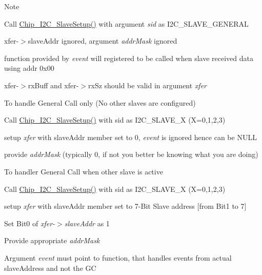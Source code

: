 \begin{DoxyNote}{Note}
\begin{DoxyItemize}
\item Call \hyperlink{group___i2_c__18_x_x__43_x_x_gaf6ea40668dde26e406f76ff3ddeda527}{Chip\+\_\+\+I2\+C\+\_\+\+Slave\+Setup()} with argument {\itshape sid} as I2\+C\+\_\+\+S\+L\+A\+V\+E\+\_\+\+G\+E\+N\+E\+R\+AL
\begin{DoxyItemize}
\item xfer-\/$>$slave\+Addr ignored, argument {\itshape addr\+Mask} ignored
\item function provided by {\itshape event} will registered to be called when slave received data using addr 0x00
\item xfer-\/$>$rx\+Buff and xfer-\/$>$rx\+Sz should be valid in argument {\itshape xfer} 
\end{DoxyItemize}
\item To handle General Call only (No other slaves are configured)
\begin{DoxyItemize}
\item Call \hyperlink{group___i2_c__18_x_x__43_x_x_gaf6ea40668dde26e406f76ff3ddeda527}{Chip\+\_\+\+I2\+C\+\_\+\+Slave\+Setup()} with sid as I2\+C\+\_\+\+S\+L\+A\+V\+E\+\_\+X (X=0,1,2,3)
\item setup {\itshape xfer} with slave\+Addr member set to 0, {\itshape event} is ignored hence can be N\+U\+LL
\item provide {\itshape addr\+Mask} (typically 0, if not you better be knowing what you are doing)
\end{DoxyItemize}
\item To handler General Call when other slave is active
\begin{DoxyItemize}
\item Call \hyperlink{group___i2_c__18_x_x__43_x_x_gaf6ea40668dde26e406f76ff3ddeda527}{Chip\+\_\+\+I2\+C\+\_\+\+Slave\+Setup()} with sid as I2\+C\+\_\+\+S\+L\+A\+V\+E\+\_\+X (X=0,1,2,3)
\item setup {\itshape xfer} with slave\+Addr member set to 7-\/\+Bit Slave address \mbox{[}from Bit1 to 7\mbox{]}
\item Set Bit0 of {\itshape xfer-\/$>$slave\+Addr} as 1
\item Provide appropriate {\itshape addr\+Mask} 
\item Argument {\itshape event} must point to function, that handles events from actual slave\+Address and not the GC 
\end{DoxyItemize}
\end{DoxyItemize}
\end{DoxyNote}
